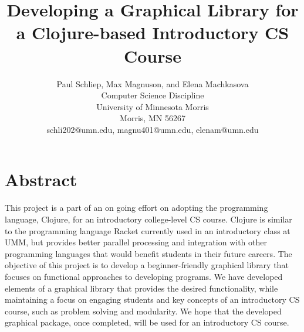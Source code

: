 \documentclass[12pt]{article}
\newcommand{\comment}[1]{{\bf \tt  {#1}}}
\begin{document}
\pagestyle{plain}
%

\title{Developing a Graphical Library for a Clojure-based Introductory CS Course}
%
%

\author{
Paul Schliep, Max Magnuson, and Elena Machkasova \\
Computer Science Discipline \\
University of Minnesota Morris\\
Morris, MN 56267\\
schli202@umn.edu, magnu401@umn.edu, elenam@umn.edu
}

\date{}

\maketitle
\thispagestyle{empty}

\section*{\centering Abstract}
This project is a part of an on going effort on adopting the programming language, Clojure, for an introductory college-level CS course.  Clojure is similar to the programming language Racket currently used in an introductory class at UMM, but provides better parallel processing and integration with other programming languages that would benefit students in their future careers. The objective of this project is to develop a beginner-friendly graphical library that focuses on functional approaches to developing programs. We have developed elements of a graphical library that provides the desired functionality, while maintaining a focus on engaging students and key concepts of an introductory CS course, such as problem solving and modularity.  We hope that the developed graphical package, once completed, will be used for an introductory CS course. 
\end{document}
